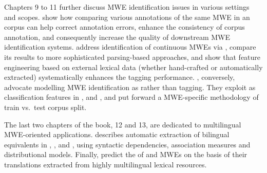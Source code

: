 \documentclass[output=paper,
modfonts,
]{langscibook}
\begin{document}
Chapters 9 %
to 11 %
further discuss MWE identification issues in various settings and scopes.  show how comparing various annotations of the same MWE in an  corpus can help correct annotation errors, enhance the consistency of corpus annotation, and consequently increase the quality of downstream MWE identification systems.  address identification of  continuous MWEs via , compare its results to more sophisticated parsing-based approaches, and show that feature engineering based on external lexical data (whether hand-crafted or automatically extracted) systematically enhances the tagging performance. , conversely, advocate 
modelling MWE identification as  rather than tagging. They exploit  as classification features in ,  and , and put forward a MWE-specific methodology of train vs.~test corpus split.

The last two chapters of the book, 12 %
and 13, %
are dedicated to multilingual MWE-oriented applications.  describes automatic extraction of bilingual  equivalents in , , and , using syntactic dependencies, association measures and distributional models. Finally,   predict the  of  and  MWEs on the basis of their translations extracted from highly multilingual lexical resources. 


\end{document}
